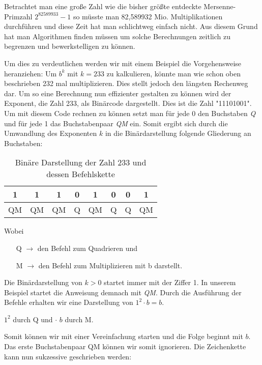 \documentclass[12pt,a4paper]{article}
\theoremstyle{definition}
\begin{document}
Betrachtet man eine große Zahl wie die bisher größte entdeckte Mersenne-Primzahl $2^{82589933} - 1$ so müsste man 82,589932 Mio. Multiplikationen durchführen und diese Zeit hat man schlichtweg einfach nicht.
Aus diesem Grund hat man Algorithmen finden müssen um solche Berechnungen zeitlich zu begrenzen und bewerkstelligen zu können.

Um dies zu verdeutlichen werden wir mit einem Beispiel die Vorgehensweise heranziehen:
Um $b^k$ mit $k=233$ zu kalkulieren, könnte man wie schon oben beschrieben 232 mal multiplizieren.
Dies stellt jedoch den längsten Rechenweg dar.
Um so eine Berechnung nun effizienter gestalten zu können wird der Exponent, die Zahl 233, als Binärcode dargestellt.
Dies ist die Zahl "11101001".
Um mit diesem Code rechnen zu können setzt man für jede 0 den Buchstaben \textit{Q} und für jede 1 das Buchstabenpaar \textit{QM} ein.
Somit ergibt sich durch die Umwandlung des Exponenten $k$ in die Binärdarstellung folgende Gliederung an Buchstaben:

\begin{table}[h]\centering
\begin{tabular}{c|c|c|c|c|c|c|c}
1 & 1 & 1 & 0 & 1 & 0 & 0 & 1 \\
\hline
QM & QM & QM & Q & QM & Q & Q & QM \\
\end{tabular}
\caption{Binäre Darstellung der Zahl 233 und dessen Befehlskette}
\label{tab:Binäre Darstellung der Zahl 233 und desses Befehlskette}
\end{table}

\newpage
Wobei
\begin{itemize}
    \item[Q] $\rightarrow$ den Befehl zum Quadrieren und
    \item[M] $\rightarrow$ den Befehl zum Multiplizieren mit b darstellt.
\end{itemize}

Die Binärdarstellung von $k > 0$ startet immer mit der Ziffer 1.
In unserem Beispiel startet die Anweisung demnach mit \textit{QM}.
Durch die Ausführung der Befehle erhalten wir eine Darstellung von ${1^2 \cdot b = b}$.
\begin{center}
${1^2}$ durch Q und $\cdot$ $b$ durch M.
\end{center}
Somit können wir mit einer Vereinfachung starten und die Folge beginnt mit $b$.
Das erste Buchstabenpaar QM können wir somit ignorieren.\newline
Die Zeichenkette kann nun sukzessive geschrieben werden:
\end{document}
